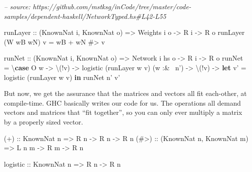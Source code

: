 \documentclass[]{article}
\newenvironment{Shaded}{}{}
\newcommand{\CommentTok}[1]{\textcolor[rgb]{0.38,0.63,0.69}{\textit{#1}}}
\newcommand{\DataTypeTok}[1]{\textcolor[rgb]{0.56,0.13,0.00}{#1}}
\newcommand{\FunctionTok}[1]{\textcolor[rgb]{0.02,0.16,0.49}{#1}}
\newcommand{\KeywordTok}[1]{\textcolor[rgb]{0.00,0.44,0.13}{\textbf{#1}}}
\newcommand{\NormalTok}[1]{#1}
\newcommand{\OtherTok}[1]{\textcolor[rgb]{0.00,0.44,0.13}{#1}}
\begin{document}
\begin{Shaded}
\begin{Highlighting}[]
\CommentTok{-- source: https://github.com/mstksg/inCode/tree/master/code-samples/dependent-haskell/NetworkTyped.hs#L42-L55}

\OtherTok{runLayer ::}\NormalTok{ (}\DataTypeTok{KnownNat}\NormalTok{ i, }\DataTypeTok{KnownNat}\NormalTok{ o)}
         \OtherTok{=>} \DataTypeTok{Weights}\NormalTok{ i o}
         \OtherTok{->} \DataTypeTok{R}\NormalTok{ i}
         \OtherTok{->} \DataTypeTok{R}\NormalTok{ o}
\NormalTok{runLayer (}\DataTypeTok{W}\NormalTok{ wB wN) v }\FunctionTok{=}\NormalTok{ wB }\FunctionTok{+}\NormalTok{ wN }\FunctionTok{#>}\NormalTok{ v}

\OtherTok{runNet ::}\NormalTok{ (}\DataTypeTok{KnownNat}\NormalTok{ i, }\DataTypeTok{KnownNat}\NormalTok{ o)}
       \OtherTok{=>} \DataTypeTok{Network}\NormalTok{ i hs o}
       \OtherTok{->} \DataTypeTok{R}\NormalTok{ i}
       \OtherTok{->} \DataTypeTok{R}\NormalTok{ o}
\NormalTok{runNet }\FunctionTok{=}\NormalTok{ \textbackslash{}}\KeywordTok{case}
   \DataTypeTok{O}\NormalTok{ w }\OtherTok{->}\NormalTok{ \textbackslash{}(}\FunctionTok{!}\NormalTok{v) }\OtherTok{->}\NormalTok{ logistic (runLayer w v)}
\NormalTok{   (w }\FunctionTok{:&~}\NormalTok{ n') }\OtherTok{->}\NormalTok{ \textbackslash{}(}\FunctionTok{!}\NormalTok{v) }\OtherTok{->} \KeywordTok{let}\NormalTok{ v' }\FunctionTok{=}\NormalTok{ logistic (runLayer w v)}
                          \KeywordTok{in}\NormalTok{ runNet n' v'}
\end{Highlighting}
\end{Shaded}

But now, we get the assurance that the matrices and vectors all fit each-other,
at compile-time. GHC basically writes our code for us. The operations all demand
vectors and matrices that ``fit together'', so you can only ever multiply a
matrix by a properly sized vector.

\begin{Shaded}
\begin{Highlighting}[]
\OtherTok{(+)  ::} \DataTypeTok{KnownNat}\NormalTok{ n}
     \OtherTok{=>} \DataTypeTok{R}\NormalTok{ n }\OtherTok{->} \DataTypeTok{R}\NormalTok{ n }\OtherTok{->} \DataTypeTok{R}\NormalTok{ n}
\OtherTok{(#>) ::}\NormalTok{ (}\DataTypeTok{KnownNat}\NormalTok{ n, }\DataTypeTok{KnownNat}\NormalTok{ m)}
     \OtherTok{=>} \DataTypeTok{L}\NormalTok{ n m }\OtherTok{->} \DataTypeTok{R}\NormalTok{ m }\OtherTok{->} \DataTypeTok{R}\NormalTok{ n}

\OtherTok{logistic ::} \DataTypeTok{KnownNat}\NormalTok{ n}
         \OtherTok{=>} \DataTypeTok{R}\NormalTok{ n }\OtherTok{->} \DataTypeTok{R}\NormalTok{ n}
\end{Highlighting}
\end{Shaded}
\end{document}
